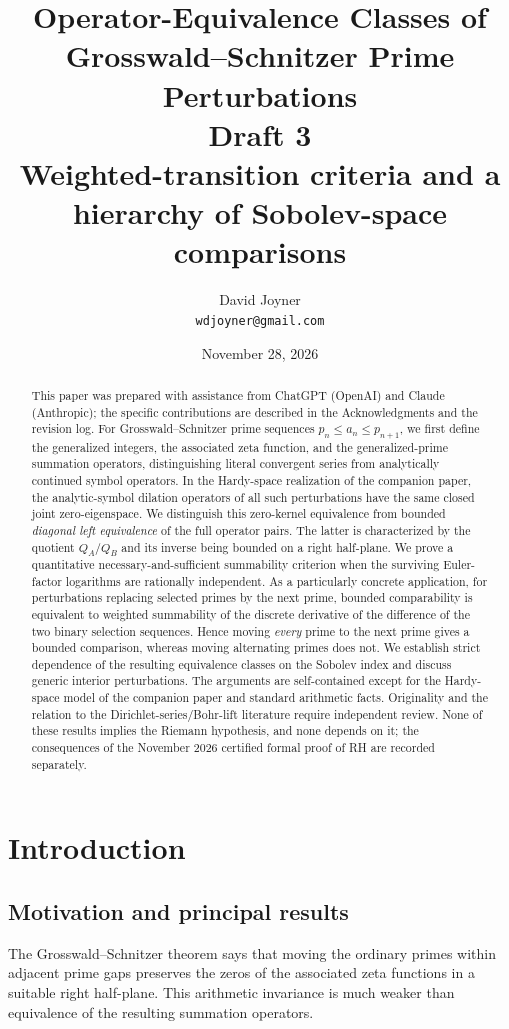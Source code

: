 \documentclass[12pt,letterpaper]{article}
\title{Operator-Equivalence Classes of Grosswald--Schnitzer Prime Perturbations\\[0.45em]
\large Draft 3\\[0.25em]
\normalsize Weighted-transition criteria and a hierarchy of Sobolev-space comparisons}
\author{David Joyner\\\texttt{wdjoyner@gmail.com}}
\date{November 28, 2026}
\numberwithin{equation}{section}
\theoremstyle{remark}
\begin{document}
\maketitle
\begin{abstract}
This paper was prepared with assistance from ChatGPT (OpenAI) and Claude (Anthropic); the specific contributions are described in the Acknowledgments and the revision log. 
For Grosswald--Schnitzer prime sequences $p_n\le a_n\le p_{n+1}$, we first define the generalized integers, the associated zeta function, and the generalized-prime summation operators, distinguishing literal convergent series from analytically continued symbol operators. In the Hardy-space realization of the companion paper, the analytic-symbol dilation operators of all such perturbations have the same closed joint zero-eigenspace. We distinguish this zero-kernel equivalence from bounded \emph{diagonal left equivalence} of the full operator pairs. The latter is characterized by the quotient $Q_A/Q_B$ and its inverse being bounded on a right half-plane. We prove a quantitative necessary-and-sufficient summability criterion when the surviving Euler-factor logarithms are rationally independent. As a particularly concrete application, for perturbations replacing selected primes by the next prime, bounded comparability is equivalent to weighted summability of the discrete derivative of the difference of the two binary selection sequences. Hence moving \emph{every} prime to the next prime gives a bounded comparison, whereas moving alternating primes does not. We establish strict dependence of the resulting equivalence classes on the Sobolev index and discuss generic interior perturbations. The arguments are self-contained except for the Hardy-space model of the companion paper and standard arithmetic facts. Originality and the relation to the Dirichlet-series/Bohr-lift literature require independent review. None of these results implies the Riemann hypothesis, and none depends on it; the consequences of the November 2026 certified formal proof of RH are recorded separately.
\end{abstract}

\clearpage
\setcounter{tocdepth}{2}
\tableofcontents
\clearpage

\section{Introduction}\label{sec:introduction}
\subsection{Motivation and principal results}
The Grosswald--Schnitzer theorem says that moving the ordinary
primes within adjacent prime gaps preserves the zeros of the
associated zeta functions in a suitable right half-plane.
This arithmetic invariance is much weaker than equivalence
of the resulting summation operators.
\end{document}
